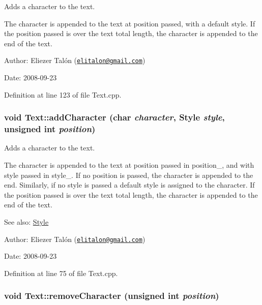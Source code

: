 Adds a character to the text. 

The character is appended to the text at position passed, with a default style. If the position passed is over the text total length, the character is appended to the end of the text.

\begin{Desc}
\item[Author:]Eliezer Talón (\href{mailto:elitalon@gmail.com}{\tt elitalon@gmail.com}) \end{Desc}
\begin{Desc}
\item[Date:]2008-09-23 \end{Desc}


Definition at line 123 of file Text.cpp.\hypertarget{class_text_a2074d216bde350970d9a4260c2d85bb}{
\subsubsection[addCharacter]{\setlength{\rightskip}{0pt plus 5cm}void Text::addCharacter (char {\em character}, \/  {\bf Style} {\em style}, \/  unsigned int {\em position})}}
\label{class_text_a2074d216bde350970d9a4260c2d85bb}


Adds a character to the text. 

The character is appended to the text at position passed in position\_\-, and with style passed in style\_\-. If no position is passed, the character is appended to the end. Similarly, if no style is passed a default style is assigned to the character. If the position passed is over the text total length, the character is appended to the end of the text.

\begin{Desc}
\item[See also:]\hyperlink{class_style}{Style}\end{Desc}
\begin{Desc}
\item[Author:]Eliezer Talón (\href{mailto:elitalon@gmail.com}{\tt elitalon@gmail.com}) \end{Desc}
\begin{Desc}
\item[Date:]2008-09-23 \end{Desc}


Definition at line 75 of file Text.cpp.\hypertarget{class_text_d62cf2b09042cfd169b8274ef3226fbd}{
\subsubsection[removeCharacter]{\setlength{\rightskip}{0pt plus 5cm}void Text::removeCharacter (unsigned int {\em position})}}
\label{class_text_d62cf2b09042cfd169b8274ef3226fbd}


